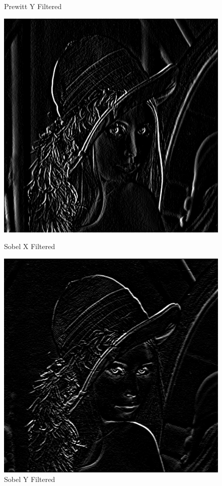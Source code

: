 \documentclass[11pt,a4paper]{article}
\begin{document}
\begin{figure}[ht!]
\begin{minipage}{0.3\textwidth}
        \caption{Prewitt Y Filtered}
    \end{minipage}
    \vskip 4pt
    \begin{minipage}{0.3\textwidth}
        \centering
        \includegraphics[width=\linewidth]{figs/task2/sobel_x_filtered.png}
        \caption{Sobel X Filtered}
    \end{minipage}
    \quad
    \begin{minipage}{0.3\textwidth}
        \centering
        \includegraphics[width=\linewidth]{figs/task2/sobel_y_filtered.png}
        \caption{Sobel Y Filtered}
    \end{minipage}
\end{figure}
\end{document}
